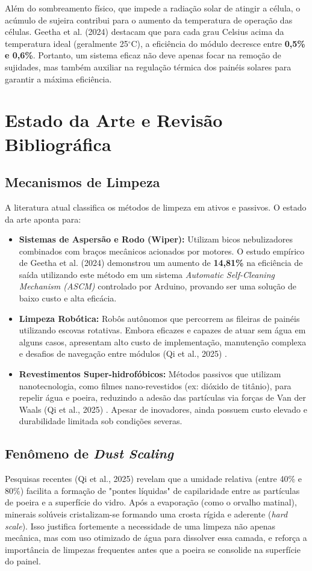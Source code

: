 \documentclass[12pt, a4paper]{article}
\begin{document}
Além do sombreamento físico, que impede a radiação solar de atingir a célula, o acúmulo de sujeira contribui para o aumento da temperatura de operação das células. Geetha et al. (2024) \cite{geetha2024} destacam que para cada grau Celsius acima da temperatura ideal (geralmente 25$^\circ$C), a eficiência do módulo decresce entre \textbf{0,5\% e 0,6\%}. Portanto, um sistema eficaz não deve apenas focar na remoção de sujidades, mas também auxiliar na regulação térmica dos painéis solares para garantir a máxima eficiência.

\section{Estado da Arte e Revisão Bibliográfica}

\subsection{Mecanismos de Limpeza}
A literatura atual classifica os métodos de limpeza em ativos e passivos. O estado da arte aponta para:
\begin{itemize}
    \item \textbf{Sistemas de Aspersão e Rodo (Wiper):} Utilizam bicos nebulizadores combinados com braços mecânicos acionados por motores. O estudo empírico de Geetha et al. (2024) \cite{geetha2024} demonstrou um aumento de \textbf{14,81\%} na eficiência de saída utilizando este método em um sistema \textit{Automatic Self-Cleaning Mechanism (ASCM)} controlado por Arduino, provando ser uma solução de baixo custo e alta eficácia.
    \item \textbf{Limpeza Robótica:} Robôs autônomos que percorrem as fileiras de painéis utilizando escovas rotativas. Embora eficazes e capazes de atuar sem água em alguns casos, apresentam alto custo de implementação, manutenção complexa e desafios de navegação entre módulos (Qi et al., 2025) \cite{qi2025}.
    \item \textbf{Revestimentos Super-hidrofóbicos:} Métodos passivos que utilizam nanotecnologia, como filmes nano-revestidos (ex: dióxido de titânio), para repelir água e poeira, reduzindo a adesão das partículas via forças de Van der Waals (Qi et al., 2025) \cite{qi2025}. Apesar de inovadores, ainda possuem custo elevado e durabilidade limitada sob condições severas.
\end{itemize}

\subsection{Fenômeno de \textit{Dust Scaling}}
Pesquisas recentes (Qi et al., 2025) \cite{qi2025} revelam que a umidade relativa (entre 40\% e 80\%) facilita a formação de "pontes líquidas" de capilaridade entre as partículas de poeira e a superfície do vidro. Após a evaporação (como o orvalho matinal), minerais solúveis cristalizam-se formando uma crosta rígida e aderente (\textit{hard scale}). Isso justifica fortemente a necessidade de uma limpeza não apenas mecânica, mas com uso otimizado de água para dissolver essa camada, e reforça a importância de limpezas frequentes antes que a poeira se consolide na superfície do painel.
\end{document}
